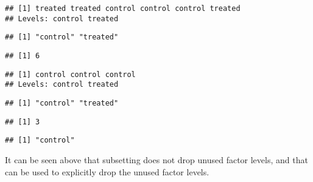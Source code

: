\documentclass[krantz2]{krantz}\usepackage{knitr}
\begin{document}
\begin{knitrout}\footnotesize
{}\color{fgcolor}\begin{kframe}
\begin{alltt}
\end{alltt}
\begin{verbatim}
## [1] treated treated control control control treated
## Levels: control treated
\end{verbatim}
\begin{alltt}
\end{alltt}
\begin{verbatim}
## [1] "control" "treated"
\end{verbatim}
\begin{alltt}
\end{alltt}
\begin{verbatim}
## [1] 6
\end{verbatim}
\begin{alltt}
 \hlkwb{<-} \hlstd{my.factor[my.factor} \hlopt{==} \hlstd{]}
\end{alltt}
\begin{verbatim}
## [1] control control control
## Levels: control treated
\end{verbatim}
\begin{alltt}
 
\end{alltt}
\begin{verbatim}
## [1] "control" "treated"
\end{verbatim}
\begin{alltt}
 
\end{alltt}
\begin{verbatim}
## [1] 3
\end{verbatim}
\begin{alltt}
 \hlkwb{<-} 
 
\end{alltt}
\begin{verbatim}
## [1] "control"
\end{verbatim}
\end{kframe}
\end{knitrout}

It can be seen above that subsetting does not drop unused factor levels, and that  can be used to explicitly drop the unused factor levels.
\end{document}

